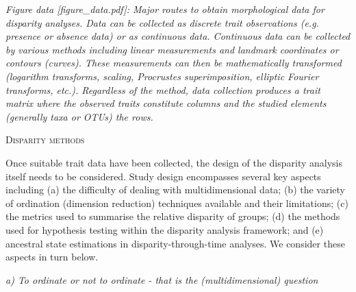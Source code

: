 \documentclass[12pt,letterpaper]{article}
\renewcommand{\section}[1]{%
\bigskip
\begin{center}
\begin{Large}
\normalfont\scshape #1
\medskip
\end{Large}
\end{center}}
\renewcommand{\subsection}[1]{%
\bigskip
\begin{center}
\begin{large}
\normalfont\itshape #1
\end{large}
\end{center}}
\begin{document}
\textit{Figure data {[}figure\_data.pdf{]}: Major routes to obtain morphological data for disparity analyses. Data can be collected as discrete trait observations (e.g. presence or absence data) or as continuous data.
Continuous data can be collected by various methods including linear measurements and landmark coordinates or contours (curves).
These measurements can then be mathematically transformed (logarithm transforms, scaling, Procrustes superimposition, elliptic Fourier transforms, etc.).
Regardless of the method, data collection produces a trait matrix where the observed traits constitute columns and the studied elements (generally taxa or OTUs) the rows.}

\section{Disparity methods}

Once suitable trait data have been collected, the design of the disparity analysis itself needs to be considered.
Study design encompasses several key aspects including (a) the difficulty of dealing with multidimensional data; (b) the variety of ordination (dimension reduction) techniques available and their limitations; (c) the metrics used to summarise the relative disparity of groups; (d) the methods used for hypothesis testing within the disparity analysis framework; and (e) ancestral state estimations in disparity-through-time analyses.
We consider these aspects in turn below.









\subsection{a) To ordinate or not to ordinate - that is the (multidimensional) question}
\end{document}
